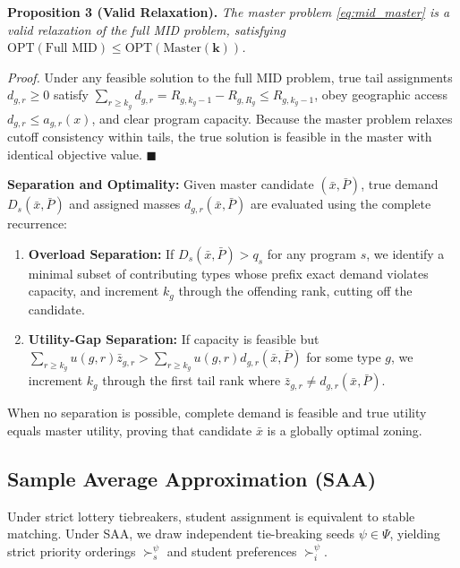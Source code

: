 \documentclass{article}
\begin{document}
\noindent\textbf{Proposition 3 (Valid Relaxation).} \textit{The master problem \eqref{eq:mid_master} is a valid relaxation of the full MID problem, satisfying $\text{OPT}(\text{Full MID}) \leq \text{OPT}(\text{Master}(\mathbf{k}))$.}

\textit{Proof.} Under any feasible solution to the full MID problem, true tail assignments $d_{g,r} \ge 0$ satisfy $\sum_{r \geq k_g} d_{g,r} = R_{g, k_g-1} - R_{g, R_g} \leq R_{g, k_g-1}$, obey geographic access $d_{g,r} \leq a_{g,r}(x)$, and clear program capacity. Because the master problem relaxes cutoff consistency within tails, the true solution is feasible in the master with identical objective value. $\blacksquare$

\noindent\textbf{Separation and Optimality:}
Given master candidate $(\bar{x}, \bar{P})$, true demand $D_s(\bar{x}, \bar{P})$ and assigned masses $d_{g,r}(\bar{x}, \bar{P})$ are evaluated using the complete recurrence:
\begin{enumerate}
    \item \textbf{Overload Separation:} If $D_s(\bar{x}, \bar{P}) > q_s$ for any program $s$, we identify a minimal subset of contributing types whose prefix exact demand violates capacity, and increment $k_g$ through the offending rank, cutting off the candidate.
    \item \textbf{Utility-Gap Separation:} If capacity is feasible but $\sum_{r \ge k_g} u(g,r) \bar{z}_{g,r} > \sum_{r \ge k_g} u(g,r) d_{g,r}(\bar{x}, \bar{P})$ for some type $g$, we increment $k_g$ through the first tail rank where $\bar{z}_{g,r} \neq d_{g,r}(\bar{x}, \bar{P})$.
\end{enumerate}
When no separation is possible, complete demand is feasible and true utility equals master utility, proving that candidate $\bar{x}$ is a globally optimal zoning.

\subsection{Sample Average Approximation (SAA)}
\label{sec:saa}
Under strict lottery tiebreakers, student assignment is equivalent to stable matching. Under SAA, we draw independent tie-breaking seeds $\psi \in \Psi$, yielding strict priority orderings $\succ_s^\psi$ and student preferences $\succ_i^\psi$.
\end{document}
